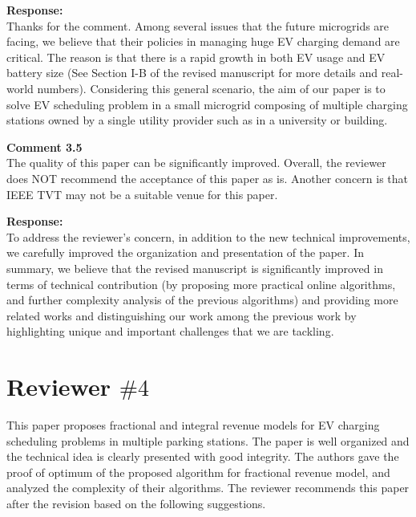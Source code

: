 \documentclass[11pt]{article}
\begin{document}
\vspace{7mm}
\noindent\textbf{Response:}\\
Thanks for the comment.
Among several issues that the future microgrids are facing, we believe that their policies in managing huge EV charging demand are critical. The reason is that there is a rapid growth in both EV usage and EV battery size (See Section I-B of the revised manuscript for more details and real-world numbers). Considering this general scenario, the aim of our paper is to solve EV scheduling problem in a small microgrid composing of multiple charging stations owned by a single utility provider such as in a university or building. 

\vspace{5mm}
{\color{blue}
\noindent\textbf{Comment 3.5}\\
The quality of this paper can be significantly improved. Overall, the reviewer does NOT recommend the acceptance of this paper as is. Another concern is that IEEE TVT may not be a suitable venue for this paper.}

\vspace{7mm}
\noindent\textbf{Response:}\\
To address the reviewer's concern, in addition to the new technical improvements, we carefully improved the organization and presentation of the paper. In summary, we believe that the revised manuscript is significantly improved in terms of technical contribution (by proposing more practical online algorithms, and further complexity analysis of the previous algorithms) and providing more related works and distinguishing our work among the previous work by highlighting unique and important challenges that we are tackling. 

\newpage
\section{Reviewer $\# 4$}
{\color{blue}This paper proposes fractional and integral revenue models for EV charging scheduling problems in multiple parking stations. The paper is well organized and the technical idea is clearly presented with good integrity. The authors gave the proof of optimum of the proposed algorithm for fractional revenue model, and analyzed the complexity of their algorithms. The reviewer recommends this paper after the revision based on the following suggestions.}
\end{document}
